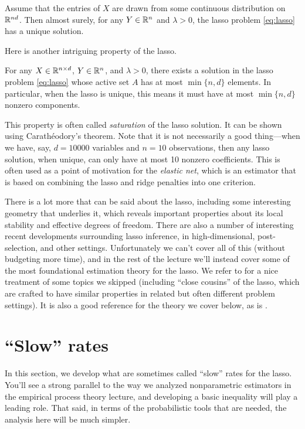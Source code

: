 \documentclass{article}
\begin{document}
\begin{corollary}
Assume that the entries of $X$ are drawn from some continuous distribution on
$\mathbb{R}^{nd}$. Then almost surely, for any $Y \in \mathbb{R}^n$ and $\lambda>0$, the lasso
problem \eqref{eq:lasso} has a unique solution.  
\end{corollary} 

Here is another intriguing property of the lasso. 

\begin{proposition}
For any $X \in \mathbb{R}^{n \times d}$, $Y \in \mathbb{R}^n$, and $\lambda>0$, there exists a 
solution in the lasso problem \eqref{eq:lasso} whose active set $A$ has at most 
$\min\{n,d\}$ elements. In particular, when the lasso is unique, this means it
must have at most $\min\{n,d\}$ nonzero components.  
\end{proposition}

This property is often called \emph{saturation} of the lasso solution. It can be
shown using Carath{\'e}odory's theorem. Note that it is not necessarily a good
thing---when we have, say, $d=10000$ variables and $n=10$ observations, then any
lasso solution, when unique, can only have at most 10 nonzero coefficients. This
is often used as a point of motivation for the \emph{elastic net}, which is an
estimator that is based on combining the lasso and ridge penalties into one
criterion.

There is a lot more that can be said about the lasso, including some interesting
geometry that underlies it, which reveals important properties about its local
stability and effective degrees of freedom. There are also a number of
interesting recent developments surrounding lasso inference, in
high-dimensional, post-selection, and other settings. Unfortunately we can't 
cover all of this (without budgeting more time), and in the rest of the lecture
we'll instead cover some of the most foundational estimation theory for the 
lasso. We refer to \citet{hastie2015statistical} for a nice treatment of some
topics we skipped (including ``close cousins'' of the lasso, which are crafted
to have similar properties in related but often different problem settings). It
is also a good reference for the theory we cover below, as is
\citet{buhlmann2011statistics}. 

\section{``Slow'' rates}

In this section, we develop what are sometimes called ``slow'' rates for the
lasso. You'll see a strong parallel to the way we analyzed nonparametric
estimators in the empirical process theory lecture, and developing a basic
inequality will play a leading role. That said, in terms of the probabilistic
tools that are needed, the analysis here will be much simpler.   
\end{document}
